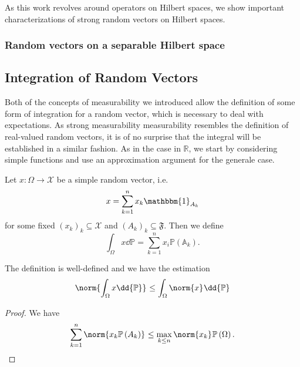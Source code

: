 As this work revolves around operators on Hilbert spaces, we show important characterizations of strong random vectors on Hilbert spaces.

\subsubsection{Random vectors on a separable Hilbert space}

\begin{lem}
    
\end{lem}


\subsection{Integration of Random Vectors}
Both of the concepts of measurability we introduced allow the definition of some form of integration for a random vector, which is necessary to deal with expectations. As strong measurability measurability resembles the definition of real-valued random vectors, it is of no surprise that the integral will be established in a similar fashion. As in the case in \( \mathbb{R} \), we start by considering simple functions and use an approximation argument for the generale case. 

\begin{defn}
   Let \( x: \Omega \to \mathcal{X} \) be a simple random vector, i.e. 
   \[ x= \sum_{k=1}^{n} x_k \mathbbm{1}_{A_k} \] 
   for some fixed \( \left(x_k\right)_k \subseteq \mathcal{X} \) and \( \left(A_{k}\right)_{k} \subseteq \mathfrak{F} \). Then we define 
   \[ \int_{\Omega}^{} x  \dd{\mathbb{P}} = \sum_{k=1}^{n} x_i \mathbb{P}\left(\mathbb{A}_k\right).\]
   
\end{defn}


\begin{lem}
    The definition is well-defined and we have the estimation 
    \[ \norm{ \int_{\Omega}^{} x  \dd{\mathbb{P}}}_{} \leq \int_{\Omega}^{} \norm{x}_{} \dd{\mathbb{P}} \]
\end{lem}

\begin{proof}
    We have 
    \[ \sum_{k=1}^{n}\norm{x_k \mathbb{P}\left(A_k\right)}_{} \leq \max_{k \leq n} \norm{x_k}_{}\mathbb{P}\left(\Omega \right). \]
\end{proof}


